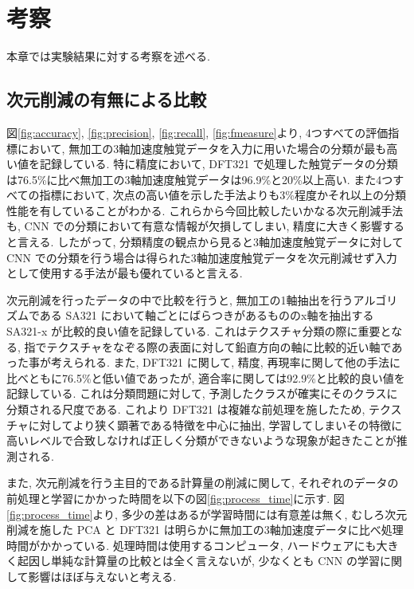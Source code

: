\chapter{考察}
\label{chap:cons}
本章では実験結果に対する考察を述べる. 
\section{次元削減の有無による比較}
図\ref{fig:accuracy}, \ref{fig:precision}, \ref{fig:recall}, \ref{fig:fmeasure}より, 4つすべての評価指標において, 無加工の3軸加速度触覚データを入力に用いた場合の分類が最も高い値を記録している. 
特に精度において,  DFT321 で処理した触覚データの分類は76.5\%に比べ無加工の3軸加速度触覚データは96.9\%と20\%以上高い. 
また4つすべての指標において, 次点の高い値を示した手法よりも3\%程度かそれ以上の分類性能を有していることがわかる. 
これらから今回比較したいかなる次元削減手法も, CNN での分類において有意な情報が欠損してしまい, 精度に大きく影響すると言える. 
したがって, 分類精度の観点から見ると3軸加速度触覚データに対して CNN での分類を行う場合は得られた3軸加速度触覚データを次元削減せず入力として使用する手法が最も優れていると言える.

次元削減を行ったデータの中で比較を行うと, 無加工の1軸抽出を行うアルゴリズムである SA321 において軸ごとにばらつきがあるもののx軸を抽出する SA321-x が比較的良い値を記録している. これはテクスチャ分類の際に重要となる, 指でテクスチャをなぞる際の表面に対して鉛直方向の軸に比較的近い軸であった事が考えられる. 
また, DFT321 に関して, 精度, 再現率に関して他の手法に比べともに76.5\%と低い値であったが, 適合率に関しては92.9\%と比較的良い値を記録している. これは分類問題に対して, 予測したクラスが確実にそのクラスに分類される尺度である. これより DFT321 は複雑な前処理を施したため, テクスチャに対してより狭く顕著である特徴を中心に抽出, 学習してしまいその特徴に高いレベルで合致しなければ正しく分類ができないような現象が起きたことが推測される. 

また, 次元削減を行う主目的である計算量の削減に関して, それぞれのデータの前処理と学習にかかった時間を以下の図\ref{fig:process_time}に示す. 
図\ref{fig:process_time}より, 多少の差はあるが学習時間には有意差は無く, むしろ次元削減を施した PCA と DFT321 は明らかに無加工の3軸加速度データに比べ処理時間がかかっている. 
処理時間は使用するコンピュータ, ハードウェアにも大きく起因し単純な計算量の比較とは全く言えないが, 少なくとも CNN の学習に関して影響はほぼ与えないと考える. 

